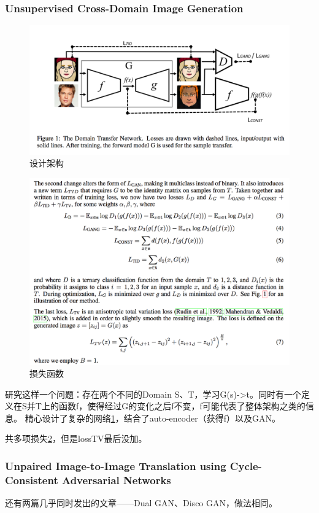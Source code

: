 \documentclass[a4paper]{article}
\begin{document}
\subsubsection{Unsupervised Cross-Domain Image Generation\cite{DBLP:journals/corr/TaigmanPW16}}
\begin{figure}
\centering
\includegraphics[width=\textwidth]{./img/12.png}
\caption{设计架构}
\label{fig:12}
\end{figure}
\begin{figure}
\centering
\includegraphics[width=\textwidth]{./img/13.png}
\caption{损失函数}
\label{fig:13}
\end{figure}
研究这样一个问题：存在两个不同的Domain S、T，学习G(s)->t。同时有一个定义在S并T上的函数f，使得经过G的变化之后f不变，f可能代表了整体架构之类的信息。
精心设计了复杂的网络\ref{fig:12}，结合了auto-encoder（获得f）以及GAN。

共多项损失\ref{fig:13}，但是lossTV最后没加。
\subsubsection{Unpaired Image-to-Image Translation using Cycle-Consistent Adversarial Networks\cite{DBLP:journals/corr/ZhuPIE17}}
还有两篇几乎同时发出的文章——Dual GAN、Disco GAN，做法相同。
\end{document}
